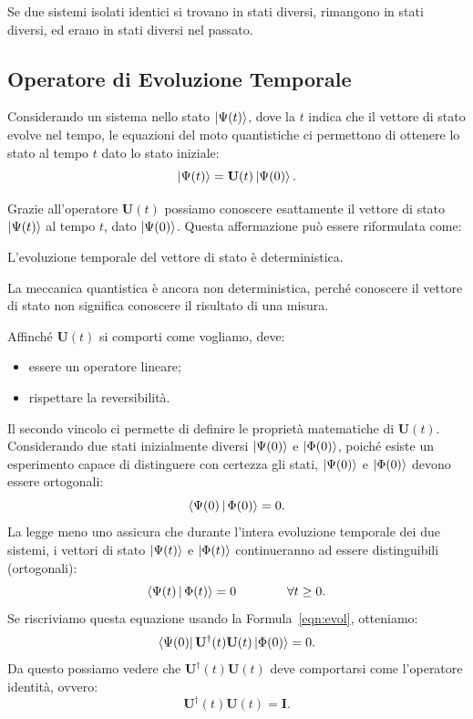 \begin{axiom}
	Se due sistemi isolati identici si trovano in stati diversi, rimangono in stati diversi, ed erano in stati diversi nel passato.
\end{axiom}

\subsection{Operatore di Evoluzione Temporale}
\label{sec:unitary_operator}
Considerando un sistema nello stato $\Ket{\Psi(t)}$, dove la $t$ indica che il vettore di stato evolve nel tempo, le equazioni del moto quantistiche ci permettono di ottenere lo stato al tempo $t$ dato lo stato iniziale:
\begin{equation}
	\label{eqn:evol}
	\Ket{\Psi(t)} = \mathbf{U}(t)\Ket{\Psi(0)}.
\end{equation}

Grazie all'operatore $\mathbf{U}(t)$ possiamo conoscere esattamente il vettore di stato $\Ket{\Psi(t)}$ al tempo $t$, dato $\Ket{\Psi(0)}$. Questa affermazione può essere riformulata come:

\begin{axiom}
	L'evoluzione temporale del vettore di stato è deterministica.
\end{axiom}

La meccanica quantistica è ancora non deterministica, perché conoscere il vettore di stato non significa conoscere il risultato di una misura.

Affinché $\mathbf{U}(t)$ si comporti come vogliamo, deve:
\begin{itemize}
	\item essere un operatore lineare;
	\item rispettare la reversibilità.
\end{itemize}

Il secondo vincolo ci permette di definire le proprietà matematiche di $\mathbf{U}(t)$. Considerando due stati inizialmente diversi $\Ket{\Psi(0)}$ e $\Ket{\Phi(0)}$, poiché esiste un esperimento capace di distinguere con certezza gli stati, $\Ket{\Psi(0)}$ e $\Ket{\Phi(0)}$ devono essere ortogonali:
\[
\Braket{\Psi(0)|\Phi(0)} = 0.
\]
La legge meno uno assicura che durante l'intera evoluzione temporale dei due sistemi, i vettori di stato $\Ket{\Psi(t)}$ e $\Ket{\Phi(t)}$ continueranno ad essere distinguibili (ortogonali):
\[
\Braket{\Psi(t)|\Phi(t)} = 0 \qquad\qquad\forall t \geq 0.
\]
Se riscriviamo questa equazione usando la Formula~\ref{eqn:evol}, otteniamo:
\[
\Bra{\Psi(0)}\mathbf{U}^\dagger(t) \mathbf{U}(t)\Ket{\Phi(0)} = 0.
\]
Da questo possiamo vedere che $\mathbf{U}^\dagger(t) \mathbf{U}(t)$ deve comportarsi come l'operatore identità, ovvero:
\begin{equation}
	\label{eqn:unit}
	\mathbf{U}^\dagger(t) \mathbf{U}(t) = \mathbf{I}.
\end{equation}

